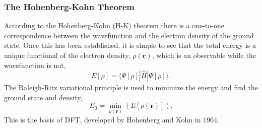 \subsubsection{The Hohenberg-Kohn Theorem}
According to the Hohenberg-Kohn (H-K) theorem there is a one-to-one correspondence between the wavefunction and the electron density of the ground state. Once this has been established, it is simple to see that the total energy is a unique functional of the electron density, $\rho(\textbf{r})$, which is an observable while the wavefunction is not,
\begin{equation}
\label{eq:H-KenergyDensity}
 E[\rho] = \langle \Psi[\rho] | \widehat{H} | \Psi[\rho] \rangle.
\end{equation}
The Raleigh-Ritz variational principle is used to minimize the energy and find the ground state and density, %
\begin{equation}
 E_{0} = \min_{\rho(\mathbf{r})} \left(E[\rho(\mathbf{r})] \right).
\label{eq:H-Kvariational}
\end{equation}
This is the basis of DFT, developed by Hohenberg and Kohn \cite{hohenberg1964} in 1964.

